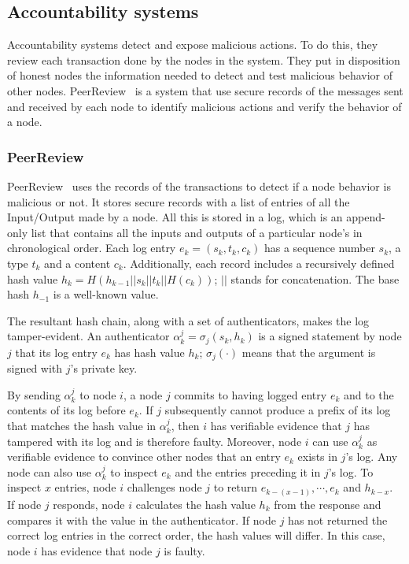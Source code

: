 \subsection{Accountability systems}
Accountability systems detect and expose malicious actions.
To do this, they review each transaction done by the nodes in the system. They
put in disposition of honest nodes the information needed to detect and test
malicious behavior of other nodes. PeerReview~\cite{haeberlen2007peerreview} is a system that
use secure records of the messages sent and received by each node to identify
malicious actions and verify the behavior of a node.

\subsubsection{PeerReview}
\label{sec:peerreview}
PeerReview~\cite{haeberlen2007peerreview} uses the records of the transactions
to detect if a node behavior is malicious or not. It stores secure records with
a list of entries of all the Input/Output made by a node. All this is stored in
a log, which is an append-only list that contains all the inputs and outputs of a
particular node's in chronological order. Each log entry $e_k = (s_k, t_k,
c_k)$ has a sequence number $s_k$, a type $t_k$ and a content $c_k$.
Additionally, each record includes a recursively defined hash value $h_k =
H(h_{k-1} || s_k|| t_k || H(c_k))$; $||$ stands for concatenation. The base
hash $h_{-1}$ is a well-known value.


The resultant hash chain, along with a set of authenticators, makes the log tamper-evident. An authenticator
$\alpha^j_k= \sigma_j(s_k , h_k )$ is a signed statement by node $j$ that its log
entry $e_k$ has hash value $h_k$; $\sigma_j (\cdot)$ means that the argument is
signed with $j$'s private key.

By sending $\alpha^j_k$ to node $i$, a node $j$ commits to having
 logged entry $e_k$ and to the contents of its log before $e_k$. If $j$
 subsequently cannot produce a prefix of its log that matches
 the hash value in $\alpha^j_k$, then $i$ has verifiable evidence that $j$
has tampered with its log and is therefore faulty.
Moreover, node $i$ can use $\alpha^j_k$ as verifiable evidence to convince
 other nodes that an entry $e_k$ exists in $j$'s log. Any node
 can also use $\alpha^j_k$ to inspect $e_k$ and the entries preceding it
 in $j$'s log. To inspect $x$ entries, node $i$ challenges node $j$ to return
 $e_{k - (x-1)}, \cdots , e_k$ and $h_{k - x}$. If node $j$ responds, node $i$ calculates the
hash value $h_k$ from the response and compares it with the
 value in the authenticator. If node $j$ has not returned the correct
 log entries in the correct order, the hash values will differ. In
this case, node $i$ has evidence that node $j$ is faulty. 
 

